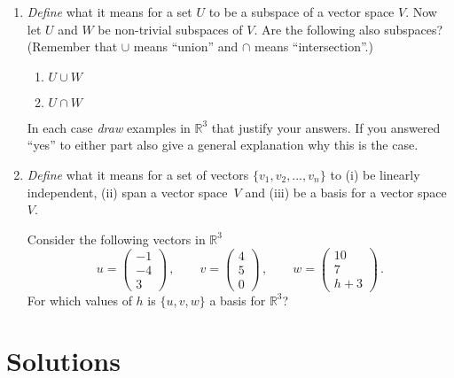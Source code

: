 \begin{enumerate}
\item
{\itshape Define} what it means for a set $U$ to be a subspace of a vector space $V$.
Now let $U$ and $W$ be non-trivial subspaces of $V$. Are the following also subspaces? (Remember that $\cup$ means ``union'' and $\cap$ means ``intersection''.)
\begin{enumerate}
\item $U \cup  W$
\item $U \cap W$ 
\end{enumerate}
In each case {\itshape draw} examples in $\mathbb R^3$ that justify your answers. If you answered ``yes'' to either part also give a general 
explanation why this is the case.

\item
{\itshape Define} what it means for a set of vectors $\{v_1,v_2,\ldots,v_n\}$ to (i) be linearly independent, (ii)
  span a vector space~$V$ and (iii)
 be a basis for a vector space~$V$.

Consider the following vectors in $\mathbb R^3$
\[ u =\begin{pmatrix} -1\\ -4\\ 3 \end{pmatrix}\, ,\qquad
     v =\begin{pmatrix} 4\\ 5\\ 0 \end{pmatrix}\, ,\qquad
    w =\begin{pmatrix} 10\\ 7\\ h+3 \end{pmatrix}\, .
\]
For which values of $h$ is $\{u,v,w\}$ a basis for $\mathbb R^3$?



 \end{enumerate}

\section*{Solutions}

